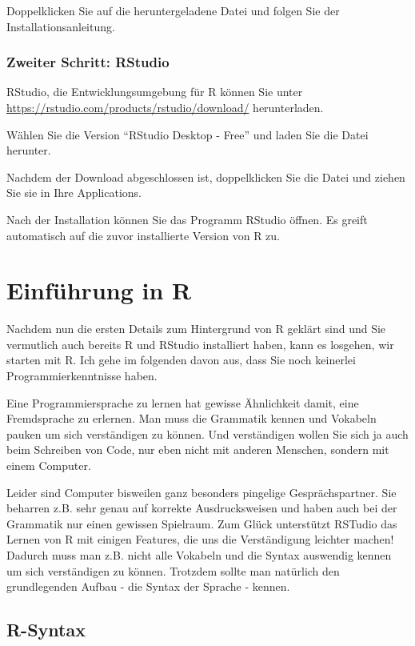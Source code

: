\documentclass[
]{book}
\begin{document}
Doppelklicken Sie auf die heruntergeladene Datei und folgen Sie der Installationsanleitung.

\hypertarget{zweiter-schritt-rstudio-1}{%
\subsection{Zweiter Schritt: RStudio}\label{zweiter-schritt-rstudio-1}}

RStudio, die Entwicklungsumgebung für R können Sie unter \url{https://rstudio.com/products/rstudio/download/} herunterladen.

Wählen Sie die Version ``RStudio Desktop - Free'' und laden Sie die Datei herunter.

Nachdem der Download abgeschlossen ist, doppelklicken Sie die Datei und ziehen Sie sie in Ihre Applications.

Nach der Installation können Sie das Programm RStudio öffnen. Es greift automatisch auf die zuvor installierte Version von R zu.

\hypertarget{einfuxfchrung-in-r-1}{%
\chapter{Einführung in R}\label{einfuxfchrung-in-r-1}}

Nachdem nun die ersten Details zum Hintergrund von R geklärt sind und Sie vermutlich auch bereits R und RStudio installiert haben, kann es losgehen, wir starten mit R. Ich gehe im folgenden davon aus, dass Sie noch keinerlei Programmierkenntnisse haben.

Eine Programmiersprache zu lernen hat gewisse Ähnlichkeit damit, eine Fremdsprache zu erlernen. Man muss die Grammatik kennen und Vokabeln pauken um sich verständigen zu können. Und verständigen wollen Sie sich ja auch beim Schreiben von Code, nur eben nicht mit anderen Menschen, sondern mit einem Computer.

Leider sind Computer bisweilen ganz besonders pingelige Gesprächspartner. Sie beharren z.B. sehr genau auf korrekte Ausdrucksweisen und haben auch bei der Grammatik nur einen gewissen Spielraum. Zum Glück unterstützt RSTudio das Lernen von R mit einigen Features, die uns die Verständigung leichter machen! Dadurch muss man z.B. nicht alle Vokabeln und die Syntax auswendig kennen um sich verständigen zu können. Trotzdem sollte man natürlich den grundlegenden Aufbau - die Syntax der Sprache - kennen.

\hypertarget{r-syntax}{%
\section{R-Syntax}\label{r-syntax}}
\end{document}
